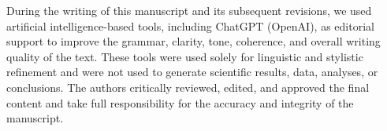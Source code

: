 \documentclass[preprint,12pt]{elsarticle}
\begin{document}
During the writing of this manuscript and its subsequent revisions, we used artificial intelligence-based tools, including ChatGPT (OpenAI), as editorial support to improve the grammar, clarity, tone, coherence, and overall writing quality of the text. These tools were used solely for linguistic and stylistic refinement and were not used to generate scientific results, data, analyses, or conclusions. The authors critically reviewed, edited, and approved the final content and take full responsibility for the accuracy and integrity of the manuscript.


 




%



\end{document}

